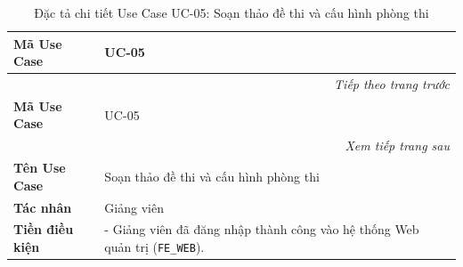 \documentclass[../DoAn.tex]{subfiles}
\begin{document}
\begin{longtable}{|p{2.8cm}|p{0.8cm}|p{2.2cm}|p{7.5cm}|}
    \caption{Đặc tả chi tiết Use Case UC-05: Soạn thảo đề thi và cấu hình phòng thi}
    \label{table:spec_uc_05} \\
    \hline
    \textbf{Mã Use Case} & \multicolumn{3}{l|}{UC-05} \\ \hline
    \endfirsthead
    \multicolumn{4}{r}{\textit{Tiếp theo trang trước}} \\
    \hline
    \textbf{Mã Use Case} & \multicolumn{3}{l|}{UC-05} \\ \hline
    \endhead
    \hline
    \multicolumn{4}{r}{\textit{Xem tiếp trang sau}} \\
    \endfoot
    \hline
    \endlastfoot
    \textbf{Tên Use Case} & \multicolumn{3}{l|}{Soạn thảo đề thi và cấu hình phòng thi} \\ \hline
    \textbf{Tác nhân} & \multicolumn{3}{l|}{Giảng viên} \\ \hline
    \textbf{Tiền điều kiện} & \multicolumn{3}{p{10.9cm}|}{- Giảng viên đã đăng nhập thành công vào hệ thống Web quản trị (\mbox{\texttt{FE\_WEB}}). 

}
\end{longtable}
\end{document}
